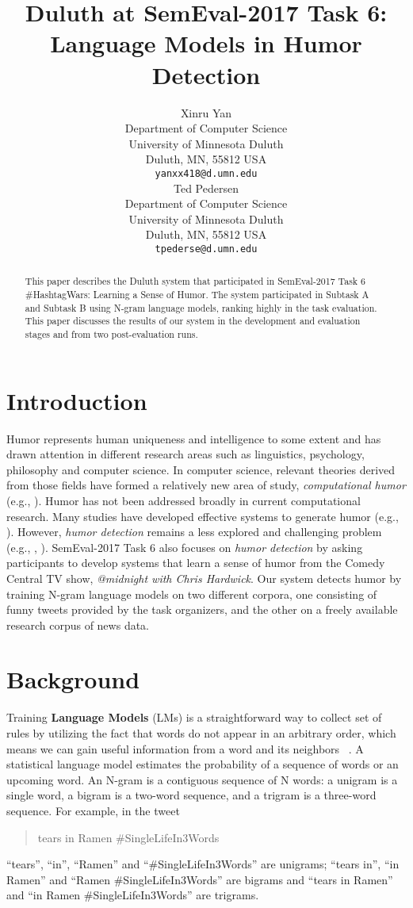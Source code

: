 \documentclass[11pt,a4paper]{article}
\title{Duluth at SemEval-2017 Task 6:  Language Models in Humor Detection}
\author{Xinru Yan \\
  Department of Computer Science \\ University of Minnesota Duluth \\ Duluth, MN, 55812 USA \\
  {\tt yanxx418@d.umn.edu} \\\And
  Ted Pedersen \\
  Department of Computer Science \\ University of Minnesota Duluth \\ Duluth, MN, 55812 USA \\
  {\tt tpederse@d.umn.edu} \\}
\date{}
\begin{document}
\maketitle
\begin{abstract}
This paper describes the Duluth system that participated in SemEval-2017 Task 6 \#HashtagWars: 
Learning a Sense of Humor. The system participated in Subtask A and Subtask B using N-gram 
language models, ranking highly in the task evaluation. This paper discusses the results of 
our system in the development and evaluation stages and from two post-evaluation runs. 
\end{abstract}

\section{Introduction}
Humor represents human uniqueness and intelligence to some extent and has drawn 
attention in different research areas such as linguistics, psychology, philosophy and 
computer science. In computer science, relevant theories derived from those fields 
have formed a relatively new area of study, \textit{computational humor} 
(e.g., \cite{Recognizing:Humor:On:Twitter}). Humor has not been addressed broadly in 
current computational research. Many studies have developed effective systems to 
generate humor (e.g., \cite{ozbal2012computational}). However, \textit{humor detection} 
remains a less explored and challenging problem (e.g., \cite{Learning:To:Laugh}, 
\cite{ShahafHM15}). SemEval-2017 Task 6 \cite{PotashRR17} 
also focuses on \textit{humor detection} by asking participants to develop systems that 
learn a sense of humor from the Comedy Central TV show, 
\textit{@midnight with Chris Hardwick}. Our system detects humor by training N-gram language models 
on two different corpora, one consisting of funny tweets provided by the task organizers, and 
the other on a freely available research corpus of news data. 

\section{Background}

Training \textbf{Language Models} (LMs) is a straightforward way to collect set of rules by 
utilizing the fact that words do not appear in an arbitrary order, which means we can gain useful information from a word 
and its neighbors ~\cite{JM}. A statistical language model estimates the probability of a sequence of words or an upcoming 
word. 
An N-gram is a contiguous sequence of N words: a unigram is a single word, a bigram is a two-word sequence, 
and a trigram is a three-word sequence. For example, in the tweet 
\begin{quote}
tears in Ramen \#SingleLifeIn3Words
\end{quote}
``tears'', ``in'', ``Ramen'' and ``\#SingleLifeIn3Words'' are unigrams; ``tears in'', 
``in Ramen'' and ``Ramen \#SingleLifeIn3Words'' 
are bigrams and ``tears in Ramen'' and ``in Ramen \#SingleLifeIn3Words'' are trigrams.
\end{document}
